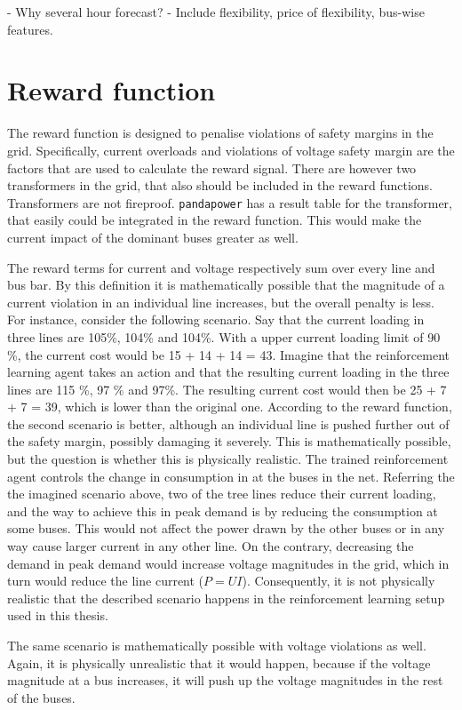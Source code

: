 \documentclass[class=book, crop=false]{standalone}
\begin{document}
- Why several hour forecast?
- Include flexibility, price of flexibility, bus-wise features. 


\section{Reward function}
The reward function is designed to penalise violations of safety margins in the grid. Specifically, current overloads and violations of voltage safety margin are the factors that are used to calculate the reward signal. There are however two transformers in the grid, that also should be included in the reward functions. Transformers are not fireproof. \texttt{pandapower} has a result table for the transformer, that easily could be integrated in the reward function. This would make the current impact of the dominant buses greater as well. 

The reward terms for current and voltage respectively sum over every line and bus bar. By this definition it is mathematically possible that the magnitude of a current violation in an individual line increases, but the overall penalty is less. For instance, consider the following scenario. Say that the current loading in three lines are 105\%, 104\% and 104\%. With a upper current loading limit of 90 \%, the current cost would be 15 + 14 + 14 = 43. Imagine that the reinforcement learning agent takes an action and that the resulting current loading in the three lines are 115 \%, 97 \% and 97\%. The resulting current cost would then be 25 + 7 + 7 = 39, which  is lower than the original one. According to the reward function, the second scenario is better, although an individual line is pushed further out of the safety margin, possibly damaging it severely. This is mathematically possible, but the question is whether this is physically realistic. The trained reinforcement agent controls the change in consumption in at the buses in the net. Referring the the imagined scenario above, two of the tree lines reduce their current loading, and the way to achieve this in peak demand is by reducing the consumption at some buses. This would not affect the power drawn by the other buses or in any way cause larger current in any other line. On the contrary, decreasing the demand in peak demand would increase voltage magnitudes in the grid, which in turn would reduce the line current ($P = UI$). Consequently, it is not physically realistic that the described scenario happens in the reinforcement learning setup used in this thesis.

The same scenario is mathematically possible with voltage violations as well. Again, it is physically unrealistic that it would happen, because if the voltage magnitude at a bus increases, it will push up the voltage magnitudes in the rest of the buses.
\end{document}
